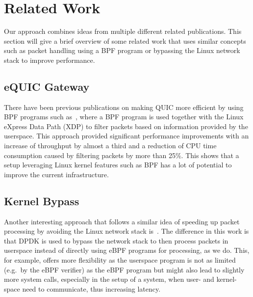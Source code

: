 \section{Related Work}\label{sec:related_work}

Our approach combines ideas from multiple different 
related publications.
This section will give a brief overview of some related work 
that uses similar concepts such as packet handling using a BPF 
program or bypassing the Linux network stack to improve performance.

\subsection{eQUIC Gateway}
There have been previous publications on making QUIC more efficient by using BPF programs
such as~\parencite{equic-gateway}, where a BPF program is used together with the Linux
eXpress Data Path (XDP) to filter packets based on information provided by the userspace.
This approach provided significant performance improvements with an increase of throughput
by almost a third and a reduction of CPU time consumption caused by filtering packets by
more than 25\%.
This shows that a setup leveraging Linux kernel features such as BPF has a lot of potential
to improve the current infrastructure.

\subsection{Kernel Bypass}
Another interesting approach that follows a similar idea of speeding up packet processing
by avoiding the Linux network stack is~\parencite{kernel-bypass-msc-thesis}.
The difference in this work is that DPDK is used to bypass the network stack to 
then process packets in userspace instead of directly using eBPF programs for processing,
as we do.
This, for example, offers more flexibility as the userspace program is not as limited (e.g.\ 
by the eBPF verifier) as the eBPF program but might also lead to slightly more system calls,
especially in the setup of a system, when user- and kernel-space need to communicate, thus 
increasing latency.

